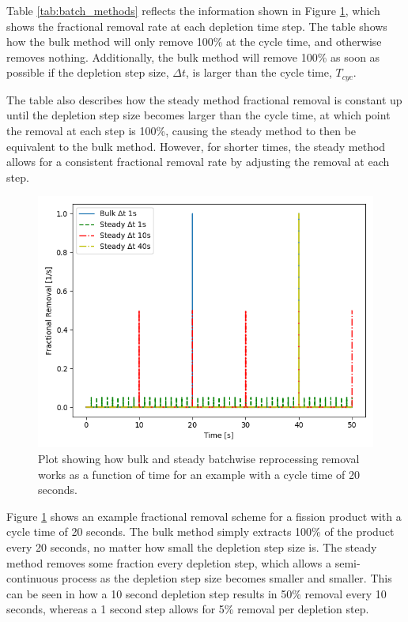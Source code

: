 Table \ref{tab:batch_methods} reflects the information shown in Figure \ref{fig:bulk_repr_cnst}, which shows the fractional removal rate at each depletion time step. The table shows how the bulk method will only remove 100\% at the cycle time, and otherwise removes nothing. Additionally, the bulk method will remove 100\% as soon as possible if the depletion step size, $\Delta t$, is larger than the cycle time, $T_{cyc}$.

The table also describes how the steady method fractional removal is constant up until the depletion step size becomes larger than the cycle time, at which point the removal at each step is 100\%, causing the steady method to then be equivalent to the bulk method. However, for shorter times, the steady method allows for a consistent fractional removal rate by adjusting the removal at each step.


\begin{figure}[H]
  \centering
  \includegraphics[scale=0.75]{images/bulk-compare-cycles.png}
  \caption{Plot showing how bulk and steady batchwise reprocessing removal works as a function of time for an example with a cycle time of 20 seconds.}
   \label{fig:bulk_repr_cnst}
\end{figure}

Figure \ref{fig:bulk_repr_cnst} shows an example fractional removal scheme for a fission product with a cycle time of 20 seconds. The bulk method simply extracts 100\% of the product every 20 seconds, no matter how small the depletion step size is. The steady method removes some fraction every depletion step, which allows a semi-continuous process as the depletion step size becomes smaller and smaller. This can be seen in how a 10 second depletion step results in 50\% removal every 10 seconds, whereas a 1 second step allows for 5\% removal per depletion step.


